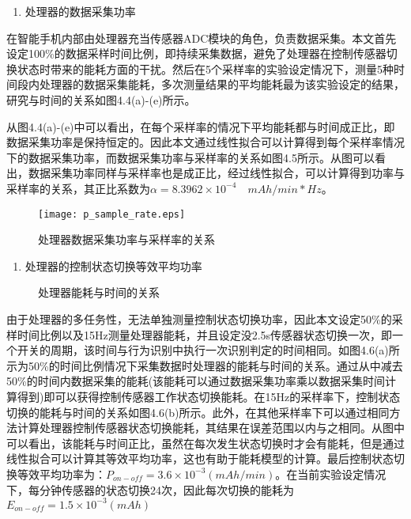\begin{enumerate}[(2)]
	\item 处理器的数据采集功率
\end{enumerate}
\par 在智能手机内部由处理器充当传感器ADC模块的角色，负责数据采集。本文首先设定100\%的数据采样时间比例，即持续采集数据，避免了处理器在控制传感器切换状态时带来的能耗方面的干扰。然后在5个采样率的实验设定情况下，测量5种时间段内处理器的数据采集能耗，多次测量结果的平均能耗最为该实验设定的结果，研究与时间的关系如图4.4(a)-(e)所示。


\par 从图4.4(a)-(e)中可以看出，在每个采样率的情况下平均能耗都与时间成正比，即数据采集功率是保持恒定的。因此本文通过线性拟合可以计算得到每个采样率情况下的数据采集功率，而数据采集功率与采样率的关系如图4.5所示。从图可以看出，数据采集功率同样与采样率也是成正比，经过线性拟合，可以计算得到功率与采样率的关系，其正比系数为$\alpha = 8.3962 \times 10^{-4} \quad mAh/min*Hz$。

\begin{figure}[!htb]
\centering
\texttt{[image: p\_sample\_rate.eps]}
\caption{处理器数据采集功率与采样率的关系}
\end{figure}


\begin{enumerate}[(3)]
	\item 处理器的控制状态切换等效平均功率
\end{enumerate}

\begin{figure}[!htb]
    \centering
    \caption{处理器能耗与时间的关系}
\end{figure}

\par 由于处理器的多任务性，无法单独测量控制状态切换功率，因此本文设定50\%的采样时间比例以及15Hz测量处理器能耗，并且设定没2.5s传感器状态切换一次，即一个开关的周期，该时间与行为识别中执行一次识别判定的时间相同。如图4.6(a)所示为50\%的时间比例情况下采集数据时处理器的能耗与时间的关系。通过从中减去50\%的时间内数据采集的能耗(该能耗可以通过数据采集功率乘以数据采集时间计算得到)即可以获得控制传感器工作状态切换能耗。在15Hz的采样率下，控制状态切换的能耗与时间的关系如图4.6(b)所示。此外，在其他采样率下可以通过相同方法计算处理器控制传感器状态切换能耗，其结果在误差范围以内与之相同。从图中可以看出，该能耗与时间正比，虽然在每次发生状态切换时才会有能耗，但是通过线性拟合可以计算其等效平均功率，这也有助于能耗模型的计算。最后控制状态切换等效平均功率为：$P_{on-off} = 3.6 \times 10^{-3} (mAh/min)$。在当前实验设定情况下，每分钟传感器的状态切换24次，因此每次切换的能耗为$E_{on-off} = 1.5 \times 10^{-3}(mAh)$


